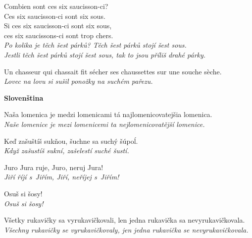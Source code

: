 \medskip

\noindent
Combien sont ces six saucisson-ci? \\
Ces six saucisson-ci sont six sous. \\
Si ces six saucisson-ci sont six sous, \\
ces six saucissons-ci sont trop chers.  \\
\textit{Po kolika je těch šest párků? Těch šest párků stojí šest sous.} \\
\textit{Jestli těch šest párků stojí šest sous, tak to jsou příliš drahé párky.}

\medskip

\noindent
Un chasseur qui chassait fit sécher ses chaussettes sur une souche sèche.  \\
\textit{Lovec na lovu si sušil ponožky na suchém pařezu.}

\medskip











\bigskip
\noindent
\textbf{Slovenština}

\medskip

\noindent
Naša lomenica je medzi lomenicami tá najlomenicovatejšia lomenica. \\
\textit{Naše lomenice je mezi lomenicemi ta nejlomenicovatější lomenice.}

\medskip

\noindent
Keď zašuštíš sukňou, šuchne sa suchý šúpoĺ. \\
\textit{Když zašustíš sukní, zašelestí suché šustí.}

\medskip

\noindent
Juro Jura ruje, Juro, neruj Jura! \\
\textit{Jiří říjí s Jiřím, Jiří, neříjej s Jiřím!}

\medskip

\noindent
Osuš si šosy! \\
\textit{Osuš si šosy!}

\medskip

\noindent
Všetky rukavičky sa vyrukavičkovali, len jedna rukavička sa nevyrukavičkovala. \\
\textit{Všechny rukavičky se vyrukavičkovaly, jen jedna rukavička se nevyrukavičkovala.}

\medskip




